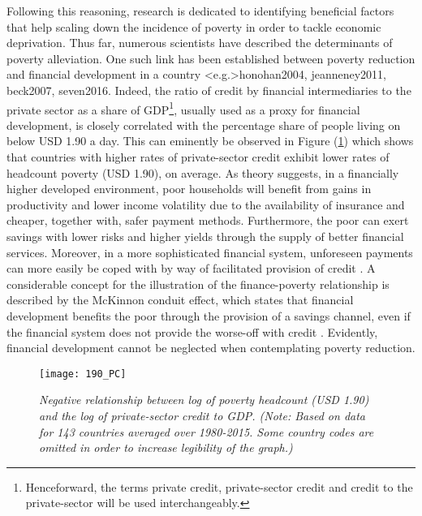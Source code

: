 \documentclass[12pt, a4paper]{article}
\begin{document}
Following this reasoning, research is dedicated to identifying beneficial factors that help scaling down the incidence of poverty in order to tackle economic deprivation. Thus far, numerous scientists have described the determinants of poverty alleviation. One such link has been established between poverty reduction and financial development in a country \shortcite<e.g.>{honohan2004, jeanneney2011, beck2007, seven2016}. Indeed, the ratio of credit by financial intermediaries to the private sector as a share of GDP\footnote{Henceforward, the terms private credit, private-sector credit and credit to the private-sector will be used interchangeably.}, usually used as a proxy for financial development, is closely correlated with the percentage share of people living on below USD 1.90 a day. This can eminently be observed in Figure (\ref{fig1}) which shows that countries with higher rates of private-sector credit exhibit lower rates of headcount poverty (USD 1.90), on average. As theory suggests, in a financially higher developed environment, poor households will benefit from gains in productivity and lower income volatility due to the availability of insurance and cheaper, together with, safer payment methods. Furthermore, the poor can exert savings with lower risks and higher yields through the supply of better financial services. Moreover, in a more sophisticated financial system, unforeseen payments can more easily be coped with by way of facilitated provision of credit \cite{claessens2007}. A considerable concept for the illustration of the finance-poverty relationship is described by the McKinnon conduit effect, which states that financial development benefits the poor through the provision of a savings channel, even if the financial system does not provide the worse-off with credit \cite{mckinnon1973}. Evidently, financial development cannot be neglected when contemplating poverty reduction.

\begin{figure}[h]
\texttt{[image: 190\_PC]}
\centering
\caption[Plot of Headcount Poverty at USD 1.90 against Private-sector Credit]{\textit{Negative relationship between log of poverty headcount (USD 1.90) and the log of private-sector credit to GDP. (Note: Based on data for 143 countries averaged over 1980-2015. Some country codes are omitted in order to increase legibility of the graph.)}}
\label{fig1}
\end{figure}
\end{document}
